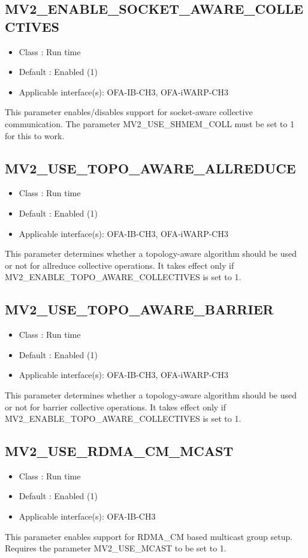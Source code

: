 \subsection{MV2\_ENABLE\_SOCKET\_AWARE\_COLLECTIVES}
\label{def:mv2-enable-socket-aware-collectives}
\begin{itemize}
\item Class : Run time
\item Default : Enabled (1)
\item Applicable interface(s): OFA-IB-CH3, OFA-iWARP-CH3
\end{itemize}
This parameter enables/disables support for socket-aware collective communication. 
The parameter MV2\_USE\_SHMEM\_COLL must be set to 1 for this to work.

\subsection{MV2\_USE\_TOPO\_AWARE\_ALLREDUCE}
\label{def:mv2-use-topo-aware-allreduce}
\begin{itemize}
\item Class : Run time
\item Default : Enabled (1)
\item Applicable interface(s): OFA-IB-CH3, OFA-iWARP-CH3
\end{itemize}
This parameter determines whether a topology-aware algorithm should be used or not for 
allreduce collective operations. It takes effect only if 
MV2\_ENABLE\_TOPO\_AWARE\_COLLECTIVES is set to 1.

\subsection{MV2\_USE\_TOPO\_AWARE\_BARRIER}
\label{def:mv2-use-topo-aware-barrier}
\begin{itemize}
\item Class : Run time
\item Default : Enabled (1)
\item Applicable interface(s): OFA-IB-CH3, OFA-iWARP-CH3
\end{itemize}
This parameter determines whether a topology-aware algorithm should be used or not for 
barrier collective operations. It takes effect only if 
MV2\_ENABLE\_TOPO\_AWARE\_COLLECTIVES is set to 1.

\subsection{MV2\_USE\_RDMA\_CM\_MCAST}
\label{def:mv2-use-rdma-cm-mcast}
\begin{itemize}
\item Class : Run time
\item Default : Enabled (1)
\item Applicable interface(s): OFA-IB-CH3
\end{itemize}
This parameter enables support for RDMA\_CM based multicast group setup. Requires 
the parameter MV2\_USE\_MCAST to be set to 1.
